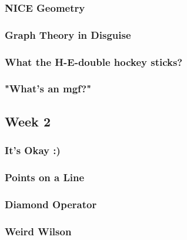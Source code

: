 \documentclass[titlepage=true]{scrartcl}
\begin{document}
    \subsubsection{NICE Geometry}
	\label{13-1-4}
	
	\newpage

    \subsubsection{Graph Theory in Disguise}
	\label{13-1-5}
	
	\newpage

    \subsubsection{What the H-E-double hockey sticks?}
	\label{13-1-6}
	
	\newpage

    \subsubsection{"What's an mgf?"}
	\label{13-1-7}
	
	\newpage

\subsection{Week 2}

    \subsubsection{It's Okay :)}
    \label{13-2-1}
    
    \newpage

    \subsubsection{Points on a Line}
	\label{13-2-2}
	
	\newpage

    \subsubsection{Diamond Operator}
	\label{13-2-3}
	
	\newpage
    
    \subsubsection{Weird Wilson}
	\label{13-2-4}
	
	\newpage
\end{document}
